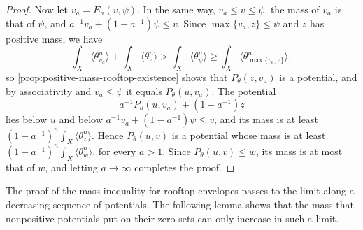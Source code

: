 \begin{proof}
Now let $v_a=E_a(v,\psi)$. In the same way, $v_a\leq v\leq\psi$, the mass of $v_a$ is that of $\psi$, and $a^{-1}v_a+(1-a^{-1})\psi\leq v$. Since $\max\{v_a,z\}\leq\psi$ and $z$ has positive mass, we have
\[
 \int_X\langle\theta_{v_a}^n\rangle+\int_X\langle\theta_z^n\rangle>\int_X\langle\theta_\psi^n\rangle
                        \geq\int_X\langle\theta_{\max\{v_a,z\}}^n\rangle,
\]
so \cref{prop:positive-mass-rooftop-existence} shows that $P_\theta(z,v_a)$ is a potential, and by associativity and $v_a\leq\psi$ it equals $P_\theta(u,v_a)$. The potential
\[
 a^{-1}P_\theta(u,v_a)+(1-a^{-1})z
\]
lies below $u$ and below $a^{-1}v_a+(1-a^{-1})\psi\leq v$, and its mass is at least $(1-a^{-1})^n\int_X\langle\theta_z^n\rangle$. Hence $P_\theta(u,v)$ is a potential whose mass is at least $(1-a^{-1})^n\int_X\langle\theta_w^n\rangle$, for every $a>1$. Since $P_\theta(u,v)\leq w$, its mass is at most that of $w$, and letting $a\to\infty$ completes the proof.
\end{proof}

The proof of the mass inequality for rooftop envelopes passes to the limit along a decreasing sequence of potentials. The following lemma shows that the mass that nonpositive potentials put on their zero sets can only increase in such a limit.

